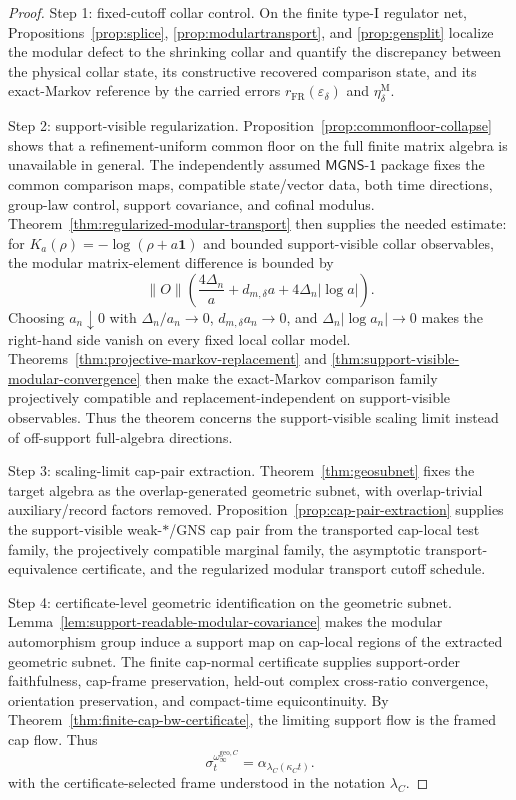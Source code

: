 \documentclass[11pt]{article}
\begin{document}
\begin{proof}
Step 1: fixed-cutoff collar control. On the finite type-I regulator net, Propositions~\ref{prop:splice}, \ref{prop:modulartransport}, and \ref{prop:gensplit} localize the modular defect to the shrinking collar and quantify the discrepancy between the physical collar state, its constructive recovered comparison state, and its exact-Markov reference by the carried errors \(r_{\mathrm{FR}}(\varepsilon_\delta)\) and \(\eta_\delta^{\mathrm M}\).

Step 2: support-visible regularization. Proposition~\ref{prop:commonfloor-collapse} shows that a refinement-uniform common floor on the full finite matrix algebra is unavailable in general. The independently assumed \(\mathsf{MGNS\text{-}1}\) package fixes the common comparison maps, compatible state/vector data, both time directions, group-law control, support covariance, and cofinal modulus. Theorem~\ref{thm:regularized-modular-transport} then supplies the needed estimate: for \(K_a(\rho)=-\log(\rho+a\mathbf1)\) and bounded support-visible collar observables, the modular matrix-element difference is bounded by
\[
\|O\|\left(\frac{4\Delta_n}{a}+d_{m,\delta}a+4\Delta_n|\log a|\right).
\]
Choosing \(a_n\downarrow0\) with \(\Delta_n/a_n\to0\), \(d_{m,\delta}a_n\to0\), and \(\Delta_n|\log a_n|\to0\) makes the right-hand side vanish on every fixed local collar model. Theorems~\ref{thm:projective-markov-replacement} and \ref{thm:support-visible-modular-convergence} then make the exact-Markov comparison family projectively compatible and replacement-independent on support-visible observables. Thus the theorem concerns the support-visible scaling limit instead of off-support full-algebra directions.

Step 3: scaling-limit cap-pair extraction. Theorem~\ref{thm:geosubnet} fixes the target algebra as the overlap-generated geometric subnet, with overlap-trivial auxiliary/record factors removed. Proposition~\ref{prop:cap-pair-extraction} supplies the support-visible weak-\(*\)/GNS cap pair from the transported cap-local test family, the projectively compatible marginal family, the asymptotic transport-equivalence certificate, and the regularized modular transport cutoff schedule.

Step 4: certificate-level geometric identification on the geometric subnet. Lemma~\ref{lem:support-readable-modular-covariance} makes the modular automorphism group induce a support map on cap-local regions of the extracted geometric subnet. The finite cap-normal certificate supplies support-order faithfulness, cap-frame preservation, held-out complex cross-ratio convergence, orientation preservation, and compact-time equicontinuity. By Theorem~\ref{thm:finite-cap-bw-certificate}, the limiting support flow is the framed cap flow. Thus
\[
\sigma_t^{\omega_\infty^{\mathrm{geo},C}}=\alpha_{\lambda_C(\kappa_C t)}.
\]
with the certificate-selected frame understood in the notation \(\lambda_C\).


\end{proof}
\end{document}
